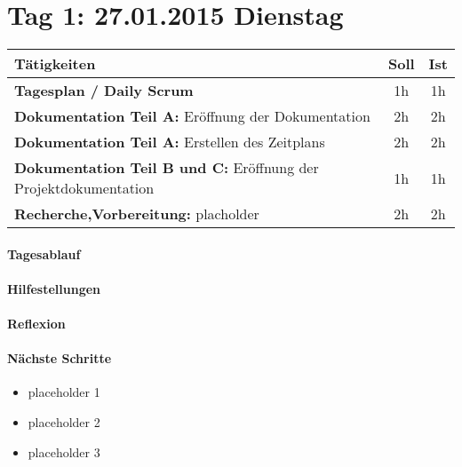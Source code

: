 \section{Tag 1: 27.01.2015 Dienstag }

\begin{table}[htb]
    \begin{tabularx}{\textwidth}{ Xcc }
        \hline
        \textbf{Tätigkeiten}                                                    & \textbf{Soll}                  & \textbf{Ist}                    \\ \hline
        \textbf{Tagesplan / Daily Scrum}                                        & 1h                             & 1h                              \\ \hline
        \textbf{Dokumentation Teil A:} Eröffnung der Dokumentation              & 2h                             & 2h                              \\ \hline
        \textbf{Dokumentation Teil A:} Erstellen des Zeitplans                  & 2h                             & 2h                              \\ \hline
        \textbf{Dokumentation Teil B und C:} Eröffnung der Projektdokumentation & 1h                             & 1h                              \\ \hline
        \textbf{Recherche,Vorbereitung:} placholder                             & 2h                             & 2h                              \\ \hline
    \end{tabularx}
\end{table}
\paragraph{Tagesablauf}
\paragraph{Hilfestellungen}
\paragraph{Reflexion}
\paragraph{Nächste Schritte}
\begin{itemize}
    \item placeholder 1
    \item placeholder 2
    \item placeholder 3
\end{itemize}
\newpage
